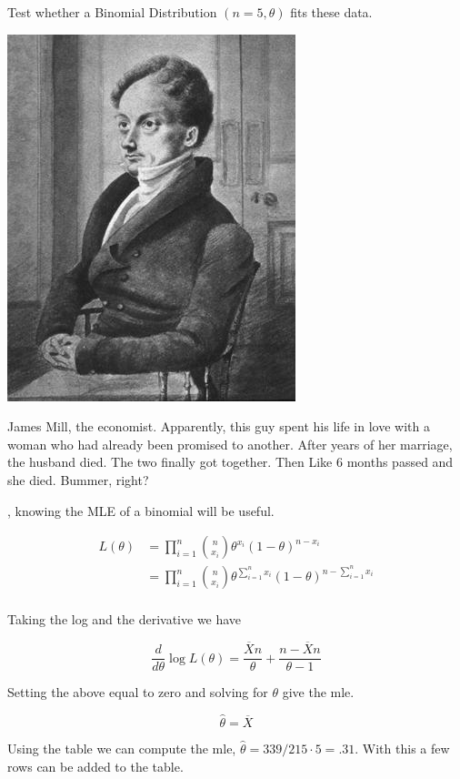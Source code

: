 \documentclass{tufte-book}
\theoremstyle{mytheoremstyle}
\theoremstyle{mylemstyle}
\theoremstyle{mydefstyle}
\begin{document}
Test whether a Binomial Distribution $(n=5, \theta)$ fits these data.

\begin{marginfigure}
\includegraphics{James_Mill}
\caption{James Mill, the economist.  Apparently, this guy spent his life in love with a woman who had already been promised to another.  After years of her marriage, the husband died.  The two finally got together.  Then Like 6 months passed and she died.  Bummer, right?}
\end{marginfigure}

, knowing the MLE of a binomial will be useful.

\begin{align*}
L(\theta) &= \prod_{i=1}^n \binom{n}{x_i} \theta^{x_i}(1-\theta)^{n-x_i} \\
&= \prod_{i=1}^n \binom{n}{x_i} \theta^{\sum_{i=1}^n x_i}(1-\theta)^{n- \sum_{i=1}^n x_i}\\
\end{align*}

Taking the log and the derivative we have

\[ \frac{d}{d\theta} \log L(\theta) = \frac{\overline{X}n}{\theta} + \frac{n- \overline{X}n}{\theta - 1} \]

Setting the above equal to zero and solving for $\theta$ give the mle.

\[ \hat{\theta} = \overline{X} \]

Using the table we can compute the mle, $\hat{\theta} = 339/215\cdot 5 = .31$.  With this a few rows can be added to the table.
\end{document}
